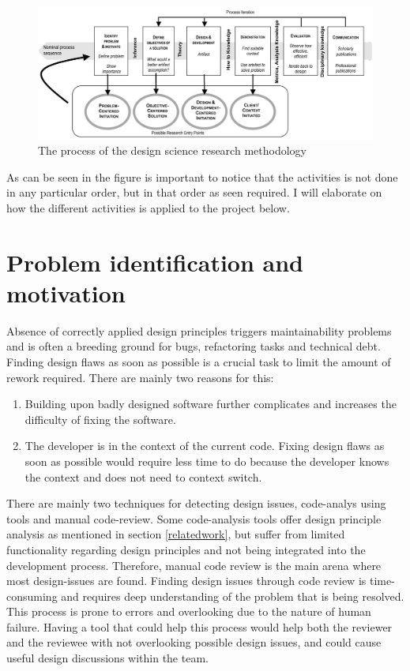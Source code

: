 \documentclass{report}
\begin{document}
\begin{figure}[h!]
    \centering
    \includegraphics[width=\textwidth]{report/images/designScience.png}
    \caption{The process of the design science research methodology}
    \label{fig:designScience}
\end{figure}



As can be seen in the figure is important to notice that the activities is not done in any particular order, but in that order as seen required. I will elaborate on how the different activities is applied to the project below. 



\section{Problem identification and motivation}
Absence of correctly applied design principles triggers maintainability problems and is often a breeding ground for bugs, refactoring tasks and technical debt. Finding design flaws as soon as possible is a crucial task to limit the amount of rework required. There are mainly two reasons for this: 

\begin{enumerate}
    \item Building upon badly designed software further complicates and increases the difficulty of fixing the software.

    \item The developer is in the context of the current code. Fixing design flaws as soon as possible would require less time to do because the developer knows the context and does not need to context switch.

\end{enumerate}

There are mainly two techniques for detecting design issues, code-analys using tools and manual code-review. Some code-analysis tools offer design principle analysis as mentioned in section \ref{relatedwork}, but suffer from limited functionality regarding design principles and not being integrated into the development process. Therefore, manual code review is the main arena where most design-issues are found. Finding design issues through code review is time-consuming and requires deep understanding of the problem that is being resolved. This process is prone to errors and overlooking due to the nature of human failure. Having a tool that could help this process would help both the reviewer and the reviewee with not overlooking possible design issues, and could cause useful design discussions within the team.
\end{document}
